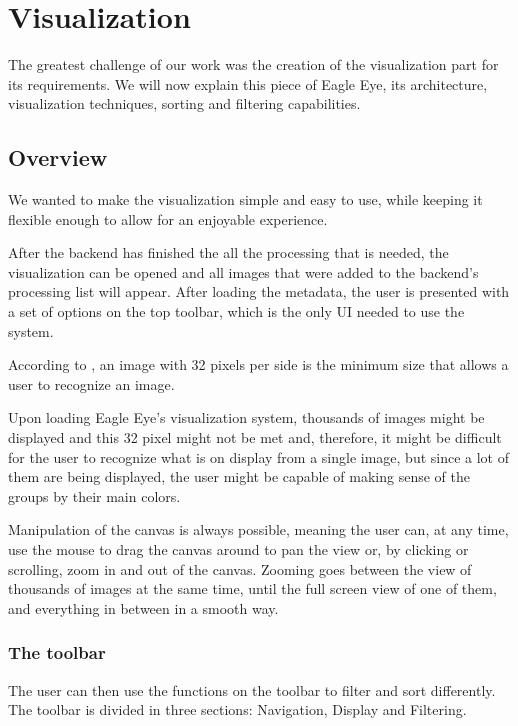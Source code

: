 \section{Visualization} %
\label{sub:visualization}

The greatest challenge of our work was the creation of the visualization part for its requirements. We will now explain this piece of Eagle Eye, its architecture, visualization techniques, sorting and filtering capabilities.

\subsection{Overview}
We wanted to make the visualization simple and easy to use, while keeping it flexible enough to allow for an enjoyable experience.

After the backend has finished the all the processing that is needed, the visualization can be opened and all images that were added to the backend's processing list will appear. After loading the metadata, the user is presented with a set of options on the top toolbar, which is the only \ac{UI} needed to use the system. 


According to , an image with 32 pixels per side is the minimum size that allows a user to recognize an image.

 Upon loading Eagle Eye's visualization system, thousands of images might be displayed and this 32 pixel might not be met and, therefore, it might be difficult for the user to recognize what is on display from a single image, but since a lot of them are being displayed, the user might be capable of making sense of the groups by their main colors.

Manipulation of the canvas is always possible, meaning the user can, at any time, use the mouse to drag the canvas around to pan the view or, by clicking or scrolling, zoom in and out of the canvas. Zooming goes between the view of thousands of images at the same time, until the full screen view of one of them, and everything in between in a smooth way.

\subsubsection{The toolbar}

The user can then use the functions on the toolbar to filter and sort differently. The toolbar is divided in three sections: Navigation, Display and Filtering.

